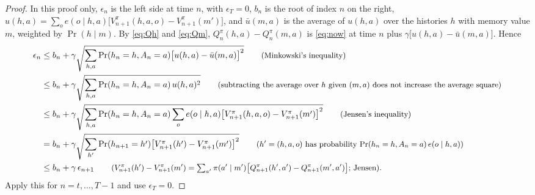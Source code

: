 \documentclass{article}
\theoremstyle{definition}
\numberwithin{equation}{section}
\newcommand{\why}[1]{\tag*{\small(#1)}}
\begin{document}
\begin{proof}
In this proof only, $\epsilon_n$ is the left side at time $n$, with $\epsilon_T=0$, $b_n$ is the root of index $n$ on the right, $u(h,a)=\sum_oe(o\mid h,a)\big[V^\pi_{n+1}(h,a,o)-V^\pi_{n+1}(m')\big]$, and $\bar u(m,a)$ is the average of $u(h,a)$ over the histories $h$ with memory value $m$, weighted by $\Pr(h\mid m)$. By \eqref{eq:Qh} and \eqref{eq:Qm}, $Q^\pi_n(h,a)-Q^\pi_n(m,a)$ is \eqref{eq:now} at time $n$ plus $\gamma\big[u(h,a)-\bar u(m,a)\big]$. Hence
\begin{align*}
\epsilon_n&\le b_n+\gamma\sqrt{\sum_{h,a}\Pr(h_n=h,A_n=a)\big[u(h,a)-\bar u(m,a)\big]^2} \why{Minkowski's inequality}\\
&\le b_n+\gamma\sqrt{\sum_{h,a}\Pr(h_n=h,A_n=a)\,u(h,a)^2} \why{subtracting the average over $h$ given $(m,a)$ does not increase the average square}\\
&\le b_n+\gamma\sqrt{\sum_{h,a}\Pr(h_n=h,A_n=a)\sum_oe(o\mid h,a)\big[V^\pi_{n+1}(h,a,o)-V^\pi_{n+1}(m')\big]^2} \why{Jensen's inequality}\\
&=b_n+\gamma\sqrt{\sum_{h'}\Pr(h_{n+1}=h')\big[V^\pi_{n+1}(h')-V^\pi_{n+1}(m')\big]^2} \why{$h'=(h,a,o)$ has probability $\Pr(h_n=h,A_n=a)\,e(o\mid h,a)$}\\
&\le b_n+\gamma\,\epsilon_{n+1} \why{$V^\pi_{n+1}(h')-V^\pi_{n+1}(m')=\sum_{a'}\pi(a'\mid m')\big[Q^\pi_{n+1}(h',a')-Q^\pi_{n+1}(m',a')\big]$; Jensen}.
\end{align*}
Apply this for $n=t,\dots,T-1$ and use $\epsilon_T=0$.
\end{proof}
\end{document}
